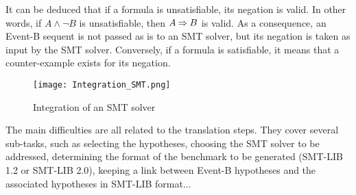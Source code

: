 It can be deduced that if a formula is unsatisfiable, its negation is valid. In other words, if $A \land \lnot B$ is unsatisfiable, then $A \mathbin\Rightarrow B$ is valid. As a consequence, an Event-B sequent is not passed as is to an SMT solver, but its negation is taken as input by the SMT solver.
Conversely, if a formula is satisfiable, it means that a counter-example exists for its negation.

\begin{figure}
\centering
\texttt{[image: Integration\_SMT.png]}
\caption{Integration of an SMT solver} 
\label{Fig:SMT solver}
\end{figure}

The main difficulties are all related to the translation steps. They cover several sub-tasks, such as selecting the hypotheses, choosing the SMT solver to be addressed, determining the format of the benchmark to be generated (SMT-LIB 1.2 or SMT-LIB 2.0), keeping a link between Event-B hypotheses and the associated hypotheses in SMT-LIB format...